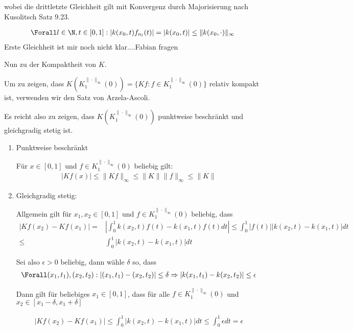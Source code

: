 \begin{solution}
wobei die drittletzte Gleichheit gilt mit Konvergenz durch Majorisierung nach Kusolitsch Satz 9.23.

\begin{align*}
  \Forall l \in \N, t \in [0,1]: |k(x_0,t)f_{n_l}(t)| = |k(x_0,t)| \leq \|k(x_0,\cdot)\|_{\infty}
\end{align*}
Erste Gleichheit ist mir noch nicht klar....Fabian fragen

Nun zu der Kompaktheit von $K$.

 Um zu zeigen, dass $K(K_{1}^{\|\cdot\|_{\infty}}(0)) = \{Kf : f \in K_{1}^{\|\cdot\|_{\infty}}(0)\}$ relativ kompakt ist, verwenden wir den Satz von Arzela-Ascoli.

 Es reicht also zu zeigen, dass $K(K_{1}^{\|\cdot\|_{\infty}}(0))$ punktweise beschränkt und gleichgradig stetig ist.

 \begin{enumerate}

 \item Punktweise beschränkt

 Für $x \in [0,1]$ und $f \in K_{1}^{\|\cdot\|_{\infty}}(0)$ beliebig gilt:
\begin{align*}
  |Kf(x)| \leq \|Kf\|_{\infty} \leq \|K\| \|f\|_{\infty} \leq \|K\|
\end{align*}

\item Gleichgradig stetig:

Allgemein gilt für $x_1, x_2 \in [0,1]$ und $f \in K_{1}^{\|\cdot\|_{\infty}}(0)$ beliebig, dass
\begin{align*}
  |Kf(x_2) - Kf(x_1)| =& | \int_{0}^{1} k(x_2,t)f(t) - k(x_1,t)f(t) dt| \leq \int_{0}^{1} |f(t)||k(x_2,t)- k(x_1,t)|dt \\
  \leq& \int_{0}^{1} |k(x_2,t)- k(x_1,t)|dt
\end{align*}

Sei also $\epsilon > 0$ beliebig, dann wähle $\delta$ so, dass
\begin{align*}
  \Forall (x_1,t_1),(x_2,t_2): | (x_1,t_1) - (x_2,t_2)| \leq \delta \Rightarrow | k(x_1,t_1) - k(x_2,t_2)| \leq \epsilon
\end{align*}

Dann gilt für beliebiges $x_1 \in [0,1]$, dass für alle $f \in K_{1}^{\|\cdot\|_{\infty}}(0)$ und $x_2 \in [x_1-\delta,x_1+\delta]$

\begin{align*}
  |Kf(x_2) - Kf(x_1)| \leq \int_{0}^{1} |k(x_2,t)- k(x_1,t)|dt \leq \int_{0}^{1} \epsilon dt = \epsilon
\end{align*}

 \end{enumerate}


\end{solution}
